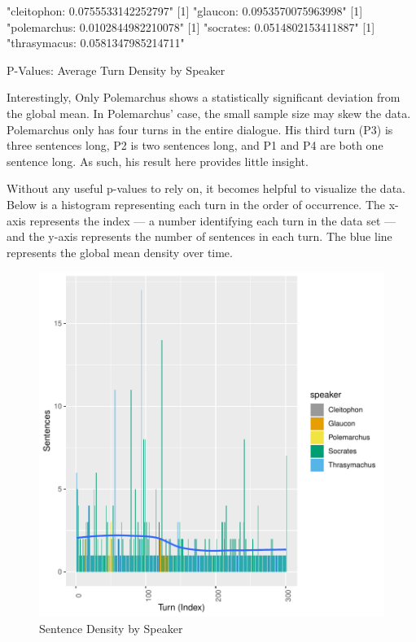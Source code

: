 \documentclass[noraggedright]{turabian-researchpaper}
\begin{document}
\begin{table}[htbp]
\begin{Schunk}
\begin{Soutput}
[1] "cleitophon: 0.0755533142252797"
[1] "glaucon: 0.0953570075963998"
[1] "polemarchus: 0.0102844982210078"
[1] "socrates: 0.0514802153411887"
[1] "thrasymacus: 0.0581347985214711"
\end{Soutput}
\end{Schunk}
\caption{P-Values: Average Turn Density by Speaker}
\label{tab:DensityPval}
\end{table}

Interestingly, Only Polemarchus shows a statistically significant deviation from
the global mean. In Polemarchus' case, the small sample size may skew the data.
Polemarchus only has four turns in the entire dialogue. His third turn (P3) is
three sentences long, P2 is two sentences long, and P1 and P4 are both one
sentence long. As such, his result here provides little insight. 

Without any useful p-values to rely on, it becomes helpful to visualize the
data. Below is a histogram representing each turn in the order of occurrence.
The x-axis represents the index — a number identifying each turn in the data
set — and the y-axis represents the number of sentences in each turn. The blue
line represents the global mean density over time.

\begin{figure}[htbp]
\includegraphics{GreatFlood-Turn_Conseq}
\caption{Sentence Density by Speaker}
\label{graph:SentenceDensity}
\end{figure}
\end{document}
